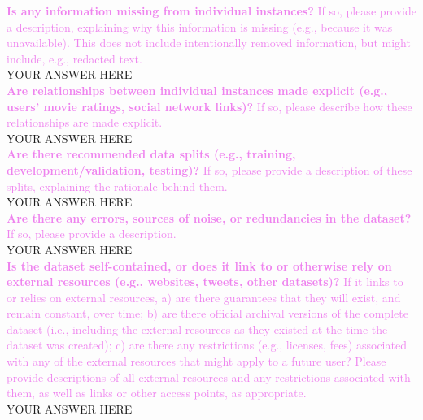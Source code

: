 \documentclass[letterpaper, 10 pt, conference]{ieeeconf}
\newcommand{\sectioncolor}{violet}
\begin{document}
    \textcolor{\sectioncolor}{\textbf{
    Is any information missing from individual instances?
    }
    If so, please provide a description, explaining why this information is
    missing (e.g., because it was unavailable). This does not include
    intentionally removed information, but might include, e.g., redacted text.
    } \\
    YOUR ANSWER HERE \\
    
    \textcolor{\sectioncolor}{\textbf{
    Are relationships between individual instances made explicit (e.g., users’
    movie ratings, social network links)?
    }
    If so, please describe how these relationships are made explicit.
    } \\
    YOUR ANSWER HERE \\
    
    \textcolor{\sectioncolor}{\textbf{
    Are there recommended data splits (e.g., training, development/validation,
    testing)?
    }
    If so, please provide a description of these splits, explaining the
    rationale behind them.
    } \\
    YOUR ANSWER HERE \\
    
    \textcolor{\sectioncolor}{\textbf{
    Are there any errors, sources of noise, or redundancies in the dataset?
    }
    If so, please provide a description.
    } \\
    YOUR ANSWER HERE \\
    
    \textcolor{\sectioncolor}{\textbf{
    Is the dataset self-contained, or does it link to or otherwise rely on
    external resources (e.g., websites, tweets, other datasets)?
    }
    If it links to or relies on external resources, a) are there guarantees
    that they will exist, and remain constant, over time; b) are there official
    archival versions of the complete dataset (i.e., including the external
    resources as they existed at the time the dataset was created); c) are
    there any restrictions (e.g., licenses, fees) associated with any of the
    external resources that might apply to a future user? Please provide
    descriptions of all external resources and any restrictions associated with
    them, as well as links or other access points, as appropriate.
    } \\
    YOUR ANSWER HERE \\
    
\end{document}
